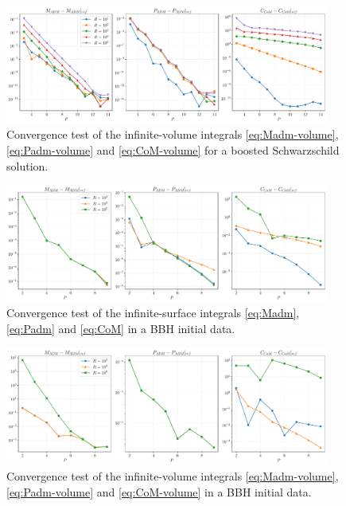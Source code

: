 \documentclass{../document}
\begin{document}
    \begin{figure}
      \centering
      \includegraphics[width=0.95\textwidth]{assets/BoostedSchwarzschild_WithVolume.pdf}
      \caption{Convergence test of the infinite-volume integrals \eqref{eq:Madm-volume}, \eqref{eq:Padm-volume} and \eqref{eq:CoM-volume} for a boosted Schwarzschild solution.}
      \label{fig:boosted-schwarzschild-with-volume}
    \end{figure}

    \begin{figure}
      \centering
      \includegraphics[width=0.95\textwidth]{assets/BBH_NoVolume.pdf}
      \caption{Convergence test of the infinite-surface integrals \eqref{eq:Madm}, \eqref{eq:Padm} and \eqref{eq:CoM} in a BBH initial data.}
      \label{fig:bbh-no-volume}
    \end{figure}

    \begin{figure}
      \centering
      \includegraphics[width=0.95\textwidth]{assets/BBH_WithVolume.pdf}
      \caption{Convergence test of the infinite-volume integrals \eqref{eq:Madm-volume}, \eqref{eq:Padm-volume} and \eqref{eq:CoM-volume} in a BBH initial data.}
      \label{fig:bbh-with-volume}
    \end{figure}
\end{document}
